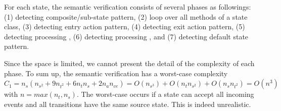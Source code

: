 For each state, the semantic verification consists of several phases as followings: (1) detecting composite/sub-state pattern, (2) loop over all methods of a state class, (3) detecting entry action pattern, (4) detecting exit action pattern, (5) detecting processing , (6) detecting processing , and (7) detecting default state pattern. 

Since the space is limited, we cannot present the detail of the complexity of each phase. To sum up, the semantic verification has a worst-case complexity $C_{1} = n_{s}(n_{s^2} + 9n_{t^2} + 6n_{t}n_{s} + 2n_{a}n_{ce}) = O (n_{s^3}) + O (n_{t}n_{s^2}) + O (n_{s}n_{t^2}) = O (n^3)$ with $n = max (n_{t}, n_{s})$. The worst-case occurs if a state can accept all incoming events and all transitions have the same source state. This is indeed unrealistic.

